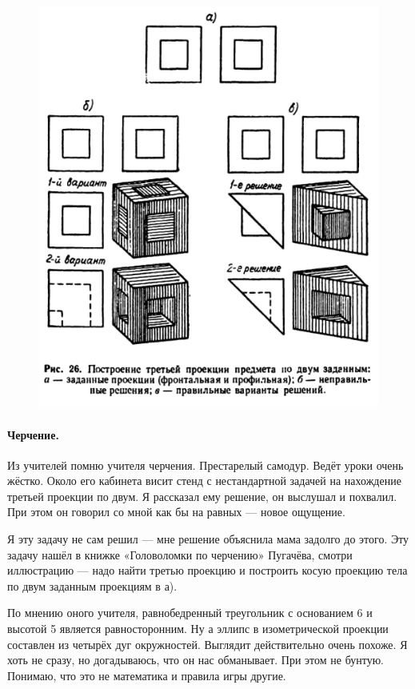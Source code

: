 \documentclass{book}
\begin{document}
\begin{figure}[ht!]
\centering
\includegraphics[scale=.7]{pics/chercenie}
\end{figure}

\paragraph{Черчение.}
Из учителей помню учителя черчения.
Престарелый самодур.
Ведёт уроки очень жёстко.
Около его кабинета висит стенд с нестандартной 
задачей на нахождение третьей проекции по двум.
Я рассказал ему решение, он выслушал и похвалил.
При этом он говорил со мной как бы на равных --- новое ощущение.

Я эту задачу не сам решил --- мне решение объяснила мама задолго до этого.
Эту задачу нашёл в книжке «Головоломки по черчению» Пугачёва, смотри иллюстрацию --- надо найти третью проекцию и построить косую проекцию тела по двум заданным проекциям в а).

По мнению оного учителя,  
равнобедренный треугольник с основанием 6 и высотой 5 является равносторонним.
Ну а эллипс в изометрической проекции составлен из четырёх дуг окружностей.
Выглядит действительно очень похоже.
Я хоть не сразу, но догадываюсь, что он нас обманывает.
При этом не бунтую. 
Понимаю, что это не математика и правила игры другие.
\end{document}
